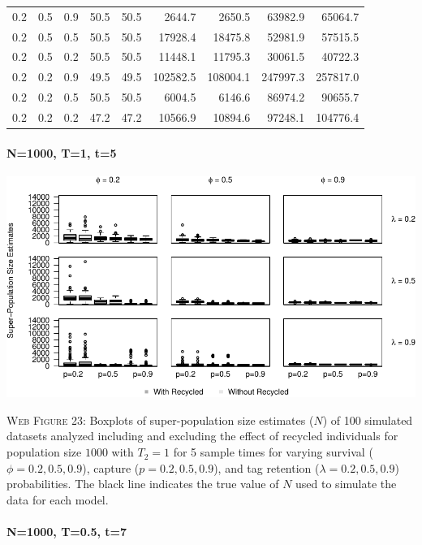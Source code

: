 \documentclass[]{article}
\let\oldparagraph\paragraph
\renewcommand{\paragraph}[1]{\oldparagraph{#1}\mbox{}}
\begin{document}
\begin{table}[ht]
{\begin{tabular}{rrrrrrrrr}
  0.2 & 0.5 & 0.9 & 50.5 & 50.5 & 2644.7 & 2650.5 & 63982.9 & 65064.7 \\ 
  0.2 & 0.5 & 0.5 & 50.5 & 50.5 & 17928.4 & 18475.8 & 52981.9 & 57515.5 \\ 
  0.2 & 0.5 & 0.2 & 50.5 & 50.5 & 11448.1 & 11795.3 & 30061.5 & 40722.3 \\ 
  0.2 & 0.2 & 0.9 & 49.5 & 49.5 & 102582.5 & 108004.1 & 247997.3 & 257817.0 \\ 
  0.2 & 0.2 & 0.5 & 50.5 & 50.5 & 6004.5 & 6146.6 & 86974.2 & 90655.7 \\ 
  0.2 & 0.2 & 0.2 & 47.2 & 47.2 & 10566.9 & 10894.6 & 97248.1 & 104776.4 \\ 
   \hline
\end{tabular}
}
\endgroup
\end{table}

\newpage

\paragraph{N=1000, T=1, t=5}\label{n1000-t1-t5-3}

\includegraphics{Appendix_BW_files/figure-latex/figure23_superN_GJSTL5-1.pdf}

\textsc{Web Figure 23:} Boxplots of super-population size estimates
(\(N\)) of 100 simulated datasets analyzed including and excluding the effect
of recycled individuals for population size \(1000\) with \(T_2=1\) for
5 sample times for varying survival (\(\phi=0.2,0.5,0.9\)), capture
(\(p=0.2,0.5,0.9\)), and tag retention (\(\lambda=0.2,0.5,0.9\))
probabilities. The black line indicates the true value of \(N\) used to
simulate the data for each model.

\paragraph{N=1000, T=0.5, t=7}\label{n1000-t0.5-t7}
\end{document}
